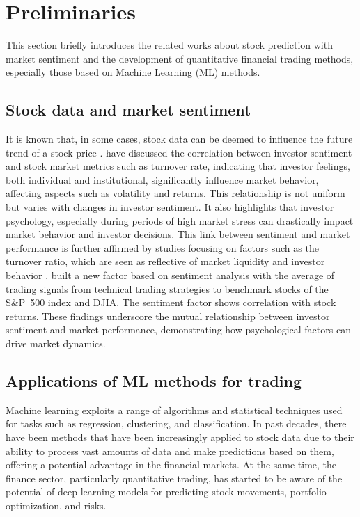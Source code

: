 \documentclass[preprint,12pt]{elsarticle}
\begin{document}
\section{Preliminaries} \label{related}
This section briefly introduces the related works about stock prediction with market sentiment and the development of quantitative financial trading methods, especially those based on Machine Learning (ML) methods. 

\subsection{Stock data and market sentiment}
It is known that, in some cases, stock data can be deemed to influence the future trend of a stock price \citep{asness1995power}. \citet{chen2020dynamic, ph2020empirical} have discussed the correlation between investor sentiment and stock market metrics such as turnover rate, indicating that investor feelings, both individual and institutional, significantly influence market behavior, affecting aspects such as volatility and returns. This relationship is not uniform but varies with changes in investor sentiment. It also highlights that investor psychology, especially during periods of high market stress can drastically impact market behavior and investor decisions. This link between sentiment and market performance is further affirmed by studies focusing on factors such as the turnover ratio, which are seen as reflective of market liquidity and investor behavior \citep{naseem2021investor}. \citet{ding2023technical} built a new factor based on sentiment analysis with the average of trading signals from technical trading strategies to benchmark stocks of the S\&P~500 index and DJIA. The sentiment factor shows correlation with stock returns. These findings underscore the mutual relationship between investor sentiment and market performance, demonstrating how psychological factors can drive market dynamics. 

\subsection{Applications of ML methods for trading}
Machine learning exploits a range of algorithms and statistical techniques used for tasks such as regression, clustering, and classification. In past decades, there have been methods that have been increasingly applied to stock data due to their ability to process vast amounts of data and make predictions based on them, offering a potential advantage in the financial markets. At the same time, the finance sector, particularly quantitative trading, has started to be aware of the potential of deep learning models for predicting stock movements, portfolio optimization, and risks. 
\end{document}
